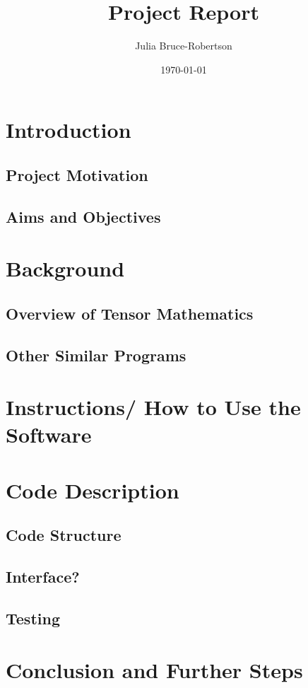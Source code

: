 \documentclass{article}
\title{Project Report}
\author{Julia Bruce-Robertson}
\date{\today}
\begin{document}
\maketitle


\section{Introduction}

\subsection{Project Motivation}

\subsection{Aims and Objectives}

\section{Background}

\subsection{Overview of Tensor Mathematics}

\subsection{Other Similar Programs}

\section{Instructions/ How to Use the Software}

\section{Code Description}

\subsection{Code Structure}

\subsection{Interface?}

\subsection{Testing}

\section{Conclusion and Further Steps}
\end{document}
